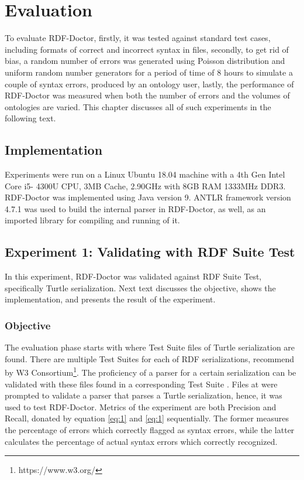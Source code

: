 \chapter{Evaluation}
\label{ch:evaluation}
To evaluate RDF-Doctor, firstly, it was tested against standard test cases, including formats of correct and incorrect syntax in files, secondly, to get rid of bias, a random number of errors was generated using Poisson distribution and uniform random number generators for a period of time of 8 hours to simulate a couple of syntax errors, produced by an ontology user, lastly, the performance of RDF-Doctor was measured when both the number of errors and the volumes of ontologies are varied. This chapter discusses all of such experiments in the following text. 
\section{Implementation}
Experiments were run on a Linux
Ubuntu 18.04 machine with a 4th Gen Intel Core i5-
4300U CPU, 3MB Cache, 2.90GHz with 8GB RAM
1333MHz DDR3. RDF-Doctor was implemented using
Java version 9. ANTLR framework version 4.7.1 was used to build the internal parser in RDF-Doctor, as well, as an imported library for compiling and running of it.  

\section{Experiment 1: Validating with RDF Suite Test} In this experiment, RDF-Doctor was validated against RDF Suite Test, specifically Turtle serialization. Next text discusses the objective, shows the implementation, and presents the result of the experiment.     
\subsection{Objective}
The evaluation phase starts with \citealp{TurtleTests:Online} where Test Suite files of Turtle serialization are found. There are multiple Test Suites for each of RDF serializations, recommend by W3 Consortium\footnote{https://www.w3.org/}. The proficiency of a parser for a certain serialization can be validated with these files found in a corresponding Test Suite . Files at \cite{TurtleTests:Online} were prompted to validate a parser that parses a Turtle serialization, hence, it was used to test RDF-Doctor. Metrics of the experiment are both Precision and Recall, donated by equation \ref{eq:1} and \ref{eq:1} sequentially. The former measures the percentage of errors which correctly flagged as syntax errors, while the latter calculates the percentage of actual syntax errors which correctly recognized. 

